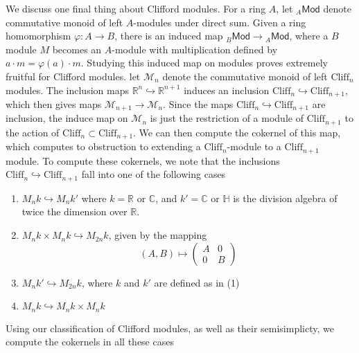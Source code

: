 \documentclass[psamsfonts, 12pt]{amsart}
\theoremstyle{definition}
\theoremstyle{remark}
\newcommand{\R}{\mathbb{R}}
\renewcommand{\H}{\mathbb{H}}
\newcommand{\C}{\mathbb{C}}
\newcommand{\Cliff}{\mathrm{Cliff}}
\begin{document}
We discuss one final thing about Clifford modules. For a ring $A$, let ${}_A\mathsf{Mod}$
denote commutative monoid of left $A$-modules under direct sum. Given a ring homomorphism
$\varphi : A \to B$, there is an induced map ${}_B \mathsf{Mod} \to {}_A \mathsf{Mod}$,
where a $B$ module $M$ becomes an $A$-module with multiplication defined by
$a \cdot m = \varphi(a) \cdot m$. Studying this induced map on modules proves extremely fruitful
for Clifford modules. let $\mathcal{M}_n$ denote the commutative monoid of left $\Cliff_n$
modules. The inclusion maps $\R^n \hookrightarrow \R^{n+1}$ induces an inclusion
$\Cliff_n \hookrightarrow \Cliff_{n+1}$, which then gives maps
$\mathcal{M}_{n+1} \to \mathcal{M}_n$. Since the maps $\Cliff_n \hookrightarrow \Cliff_{n+1}$
are inclusion, the induce map on $\mathcal{M}_n$ is just the restriction of a module of
$\Cliff_{n+1}$ to the action of $\Cliff_n \subset \Cliff_{n+1}$. We can then compute the
cokernel of this map, which computes to obstruction to extending a $\Cliff_n$-module to a
$\Cliff_{n+1}$ module. To compute these cokernels, we note that the inclusions
$\Cliff_n \hookrightarrow \Cliff_{n+1}$ fall into one of the following cases
\begin{enumerate}
  \item $M_nk \hookrightarrow M_nk'$ where $k = \R$ or $\C$, and $k' = \C$ or $\H$ is the
  division algebra of twice the dimension over $\R$.
  \item $M_nk \times M_nk \hookrightarrow M_{2n}k$, given by the mapping
  \[
  (A,B) \mapsto \begin{pmatrix}
  A & 0 \\
  0 & B
  \end{pmatrix}
  \]
  \item $M_nk' \hookrightarrow M_{2n}k$, where $k$ and $k'$ are defined as in (1)
  \item $M_nk \hookrightarrow M_nk \times M_nk$
\end{enumerate}
%
Using our classification of Clifford modules, as well as their semisimplicty, we compute the
cokernels in all these cases
\end{document}
